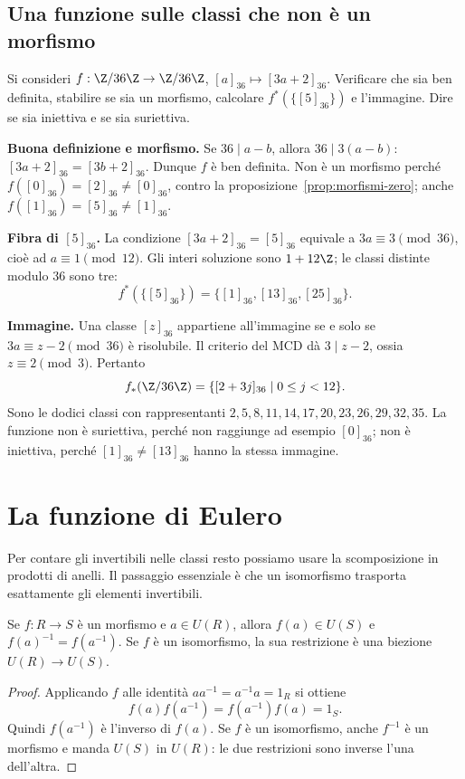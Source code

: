 \subsection{Una funzione sulle classi che non è un morfismo}
\begin{esercizio}
Si consideri $f:\Z/36\Z\to\Z/36\Z$, $[a]_{36}\mapsto[3a+2]_{36}$. Verificare che sia ben definita, stabilire se sia un morfismo, calcolare $f^*(\{[5]_{36}\})$ e l'immagine. Dire se sia iniettiva e se sia suriettiva.
\end{esercizio}
\begin{svolgimento}
\textbf{Buona definizione e morfismo.} Se $36\mid a-b$, allora $36\mid3(a-b)$: $[3a+2]_{36}=[3b+2]_{36}$. Dunque $f$ è ben definita. Non è un morfismo perché $f([0]_{36})=[2]_{36}\ne[0]_{36}$, contro la proposizione~\ref{prop:morfismi-zero}; anche $f([1]_{36})=[5]_{36}\ne[1]_{36}$.

\textbf{Fibra di $[5]_{36}$.} La condizione $[3a+2]_{36}=[5]_{36}$ equivale a $3a\equiv3\pmod{36}$, cioè ad $a\equiv1\pmod{12}$. Gli interi soluzione sono $1+12\Z$; le classi distinte modulo $36$ sono tre:
\[
f^*(\{[5]_{36}\})=\{[1]_{36},[13]_{36},[25]_{36}\}.
\]

\textbf{Immagine.} Una classe $[z]_{36}$ appartiene all'immagine se e solo se $3a\equiv z-2\pmod{36}$ è risolubile. Il criterio del MCD dà $3\mid z-2$, ossia $z\equiv2\pmod3$. Pertanto
\[
f_*(\Z/36\Z)=\{[2+3j]_{36}\mid 0\le j<12\}.
\]
Sono le dodici classi con rappresentanti $2,5,8,11,14,17,20,23,26,29,32,35$. La funzione non è suriettiva, perché non raggiunge ad esempio $[0]_{36}$; non è iniettiva, perché $[1]_{36}\ne[13]_{36}$ hanno la stessa immagine.
\end{svolgimento}

\section{La funzione di Eulero}
Per contare gli invertibili nelle classi resto possiamo usare la scomposizione in prodotti di anelli. Il passaggio essenziale è che un isomorfismo trasporta esattamente gli elementi invertibili.

\begin{proposizione}\label{prop:trasporto-unita}
Se $f:R\to S$ è un morfismo e $a\in U(R)$, allora $f(a)\in U(S)$ e $f(a)^{-1}=f(a^{-1})$. Se $f$ è un isomorfismo, la sua restrizione è una biezione $U(R)\to U(S)$.
\end{proposizione}
\begin{proof}
Applicando $f$ alle identità $aa^{-1}=a^{-1}a=1_R$ si ottiene
\[
f(a)f(a^{-1})=f(a^{-1})f(a)=1_S.
\]
Quindi $f(a^{-1})$ è l'inverso di $f(a)$. Se $f$ è un isomorfismo, anche $f^{-1}$ è un morfismo e manda $U(S)$ in $U(R)$: le due restrizioni sono inverse l'una dell'altra.
\end{proof}

